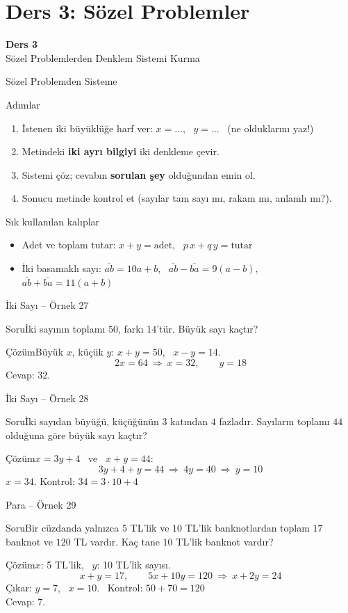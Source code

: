 \documentclass[aspectratio=169,11pt,handout]{beamer}
\newcommand{\soru}[3]{%
\begin{frame}{#1}
  \begin{block}{Soru}\large #2\end{block}
  \pause
  \begin{exampleblock}{Çözüm}\large #3\end{exampleblock}
\end{frame}}
\newcommand{\ab}[1]{\overline{#1}}
\begin{document}
\section{Ders 3: Sözel Problemler}
\begin{frame}
\centering\Large\color{anamavi}\textbf{Ders 3}\\[6pt]\normalsize Sözel Problemlerden Denklem Sistemi Kurma
\end{frame}

\begin{frame}{Sözel Problemden Sisteme}
\begin{block}{Adımlar}
\begin{enumerate}
\item İstenen iki büyüklüğe harf ver: \(x=\dots\), \ \(y=\dots\) \ (ne olduklarını yaz!)
\item Metindeki \textbf{iki ayrı bilgiyi} iki denkleme çevir.
\item Sistemi çöz; cevabın \textbf{sorulan şey} olduğundan emin ol.
\item Sonucu metinde kontrol et (sayılar tam sayı mı, rakam mı, anlamlı mı?).
\end{enumerate}
\end{block}
\begin{block}{Sık kullanılan kalıplar}
\begin{itemize}
\item Adet ve toplam tutar: \(x+y=\text{adet}\), \ \(p\,x+q\,y=\text{tutar}\)
\item İki basamaklı sayı: \(\ab{ab}=10a+b\), \ \(\ab{ab}-\ab{ba}=9(a-b)\), \ \(\ab{ab}+\ab{ba}=11(a+b)\)
\end{itemize}
\end{block}
\end{frame}

\soru{İki Sayı -- Örnek 27}
{İki sayının toplamı \(50\), farkı \(14\)'tür. Büyük sayı kaçtır?}
{Büyük \(x\), küçük \(y\): \quad \(x+y=50\), \ \(x-y=14\).
\[2x=64\ \Rightarrow\ x=32,\qquad y=18\]
Cevap: \(32\).}

\soru{İki Sayı -- Örnek 28}
{İki sayıdan büyüğü, küçüğünün \(3\) katından \(4\) fazladır. Sayıların toplamı \(44\) olduğuna göre büyük sayı kaçtır?}
{\(x=3y+4\) \ ve \ \(x+y=44\):
\[3y+4+y=44\ \Rightarrow\ 4y=40\ \Rightarrow\ y=10\]
\(x=34\). \quad Kontrol: \(34=3\cdot 10+4\) \checkmark}

\soru{Para -- Örnek 29}
{Bir cüzdanda yalnızca \(5\) TL'lik ve \(10\) TL'lik banknotlardan toplam \(17\) banknot ve \(120\) TL vardır. Kaç tane \(10\) TL'lik banknot vardır?}
{\(x\): 5 TL'lik, \ \(y\): 10 TL'lik sayısı.
\[x+y=17,\qquad 5x+10y=120\ \Rightarrow\ x+2y=24\]
Çıkar: \(y=7\), \ \(x=10\). \ Kontrol: \(50+70=120\) \checkmark\\
Cevap: \(7\).}
\end{document}
